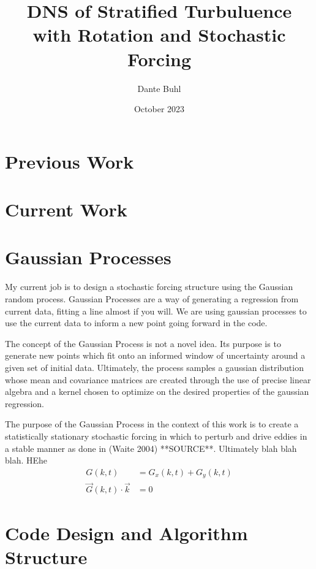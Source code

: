 \documentclass{article}
\title{DNS of Stratified Turbuluence with Rotation and Stochastic Forcing}
\author{Dante Buhl}
\date{October 2023}
\begin{document}
\maketitle

\section{Previous Work}


\section{Current Work}


\section{Gaussian Processes}
\begin{comment}
    
\end{comment}

My current job is to design a stochastic forcing structure using the Gaussian random process. Gaussian Processes are a way of generating a regression from current data, fitting a line almost if you will. We are using gaussian processes to use the current data to inform a new point going forward in the code. 

The concept of the Gaussian Process is not a novel idea. Its purpose is to generate new points which fit onto an informed window of uncertainty around a given set of initial data. Ultimately, the process samples a gaussian distribution whose mean and covariance matrices are created through the use of precise linear algebra and a kernel chosen to optimize on the desired properties of the gaussian regression. 

The purpose of the Gaussian Process in the context of this work is to create a statistically stationary stochastic forcing in which to perturb and drive eddies in a stable manner as done in (Waite 2004) **SOURCE**. Ultimately blah blah blah. HEhe
\begin{align*}
    G(k, t) &= G_x(k, t) + G_y(k, t) \\
    \vec{G}(k, t) \cdot \vec{k} &= 0
\end{align*}


\section{Code Design and Algorithm Structure}
\end{document}
